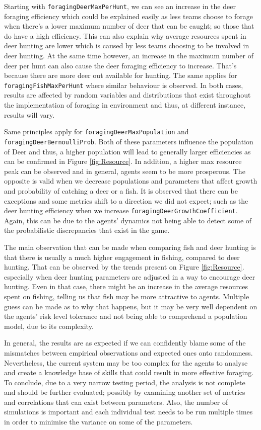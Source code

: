 Starting with \texttt{foragingDeerMaxPerHunt}, we can see an increase in the deer foraging efficiency which could be explained easily as less teams choose to forage when there’s a lower maximum number of deer that can be caught; so those that do have a high efficiency. This can also explain why average resources spent in deer hunting are lower which is caused by less teams choosing to be involved in deer hunting. At the same time however, an increase in the maximum number of deer per hunt can also cause the deer foraging efficiency to increase. That’s because there are more deer out available for hunting. The same applies for \texttt{foragingFishMaxPerHunt} where similar behaviour is observed. In both cases, results are affected by random variables and distributions that exist throughout the implementation of foraging in environment and thus, at different instance, results will vary.


Same principles apply for \texttt{foragingDeerMaxPopulation} and \texttt{foragingDeerBernoulliProb}. Both of these parameters influence the population of Deer and thus, a higher population will lead to generally larger efficiencies as can be confirmed in Figure \ref{fig:Resource}. In addition, a higher max resource peak can be observed and in general, agents seem to be more prosperous. The opposite is valid when we decrease populations and parameters that affect growth and probability of catching a deer or a fish. It is observed that there can be exceptions and some metrics shift to a direction we did not expect; such as the deer hunting efficiency when we increase \texttt{foragingDeerGrowthCoefficient}. Again, this can be due to the agents’ dynamics not being able to detect some of the probabilistic discrepancies that exist in the game.

The main observation that can be made when comparing fish and deer hunting is that there is usually a much higher engagement in fishing, compared to deer hunting. That can be observed by the trends present on Figure \ref{fig:Resource}. especially when deer hunting parameters are adjusted in a way to encourage deer hunting. Even in that case, there might be an increase in the average resources spent on fishing, telling us that fish may be more attractive to agents. Multiple guess can be made as to why that happens, but it may be very well dependent on the agents’ risk level tolerance and not being able to comprehend a population model, due to its complexity.

In general, the results are as expected if we can confidently blame some of the mismatches between empirical observations and expected ones onto randomness. Nevertheless, the current system may be too complex for the agents to analyse and create a knowledge base of skills that could result in more effective foraging. To conclude, due to a very narrow testing period, the analysis is not complete and should be further evaluated; possibly by examining another set of metrics and correlations that can exist between parameters. Also, the number of simulations is important and each individual test needs to be run multiple times in order to minimise the variance on some of the parameters. 






